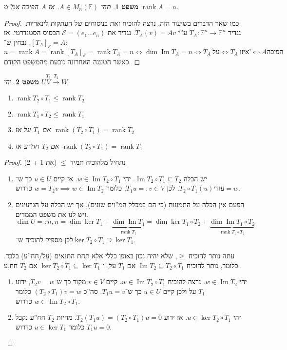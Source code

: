 \documentclass[]{article}
\makeatletter
\newcommand{\skipitems}[1]{
	\addtocounter{\@enumctr}{#1}
}
\newcommand\ec    {\mathcal{E}}
\DeclareMathOperator\Img   {Im}
\DeclareMathOperator{\rk}     {rank}
\newcommand\F         {\mathbb{F}}
\newcommand\co        {\colon}
\newtheorem{Theorem}{משפט}
\theoremstyle{definition}
\newcommand\theo  [1] {\begin{Theorem}#1\end{Theorem}}
\makeatother
\begin{document}
	\theo{תהי $A \in M_n(\F)$. אז $A$ הפיכה אמ''מ $\rk A = n$. }\begin{proof}
		כמו שאר הדברים בשיעור הזה, נרצה להוכיח זאת בניסוחים של העתקות לינאריות. נגדיר $T_A \co \F^n \to \F^n$ ע''י $T_A(v) = Av$. נגדיר את $\ec = (e_1 \dots e_n)$ הבסיס הסטנדרטי. אז $[T_A]_\ec = A$. נבחין ש־: 
		\[ n = \rk A = \rk [T_A]_\ec = \rk T_A = n \iff \dim \Img T_A = n \iff T_A \ \text{על} \iff T_A \ \text{איזו'} \iff A \text{הפיכה} \]
		כאשר הטענה האחרונה נובעת מהמשפט הקודם. 
	\end{proof}
	
	\dotfill
	
	\theo{יהי $U \overset{T_1}{V} \overset{T_2}{\to} W$. 
	\begin{enumerate}
		\item $\rk T_2 \circ T_1 \le \rk T_2$
		\item $\rk T_1 \circ T_2 \le \rk T_1$
		\item אם $T_1$ על אז $\rk (T_2 \circ T_1) = \rk T_2$
		\item אם $T_2$ חח''ע אז $\rk (T_2 \circ T_1) = \rk T_1$
	\end{enumerate}}
	\begin{proof}
		נתחיל מלהוכיח תמיד $\le$ (את 1 + 2)
		\begin{enumerate}
			\item יש הכלה $\Img T_2 \circ T_1 \subseteq T_2$. יהי $w \in \Img T_2 \circ T_1$. אז קיים $u \in U$ כך ש־$T_2 \circ T_1(u)ידוע = w$. לכן $T_1u =: v \in V$, כלומר $w = T_2 v \implies w \in \Img T_2$ כדרוש. 
			\item הפעם אין הכלה על התמונות (כי הם במכלל המ''וים שונים), אך יש הכלה על הגרעינים ויש לנו את משפט הממדים. 
			\[ \dim U =: n, n = \dim \ker T_1 + \underbrace{\dim \Img T_1}_{\rk T_1} = \dim \ker T_1 \circ T_2 + \underbrace{\dim \Img T_1 \circ T_2}_{\rk T_1 \circ T_2} \]
			לכן מספיק להוכיח ש־$\ker T_2 \circ T_1 \supseteq \ker T_1$. 
		\end{enumerate}
		עתה נותר להוכיח $\ge$, שלא יהיה נכון באופן כללי אלא תחת התנאים (על/חח''ע) בלבד. כלומר, נותר להוכיח $\Img T_2 \subseteq T_2 \circ T_1$ אם $T_1$ על, ו־$\ker T_2 \circ T_1 \subseteq \ker T_1$ אם $T_2$ חח,ע. 
		\begin{enumerate}
			\skipitems{2}
			\item יהי $w \in \Img T_2$. נרצה להוכיח $w \in \Img T_2 \circ T_1$. קיים $v \in V$ מקור כך ש־$T_2 v = w$, ידוע $T_1$ על ולכן קיים $u \in U$ כך ש־$T_1u = v$. סה''כ $(T_2 \circ T_1)v = w$ כלומר $w \in \Img T_2 \circ T_1 $ כדרוש. 
			\item יהי $u \in \ker T_2 \circ T_1$. אז ידוע $T_2(T_1u) = (T_2 \circ T_1)u = 0$. מהיות $T_2$ חח''ע נקבל $T_1u = 0$ כלומר $u \in \ker T_1$ כדרוש. 
		\end{enumerate}
	\end{proof}
	
\end{document}
